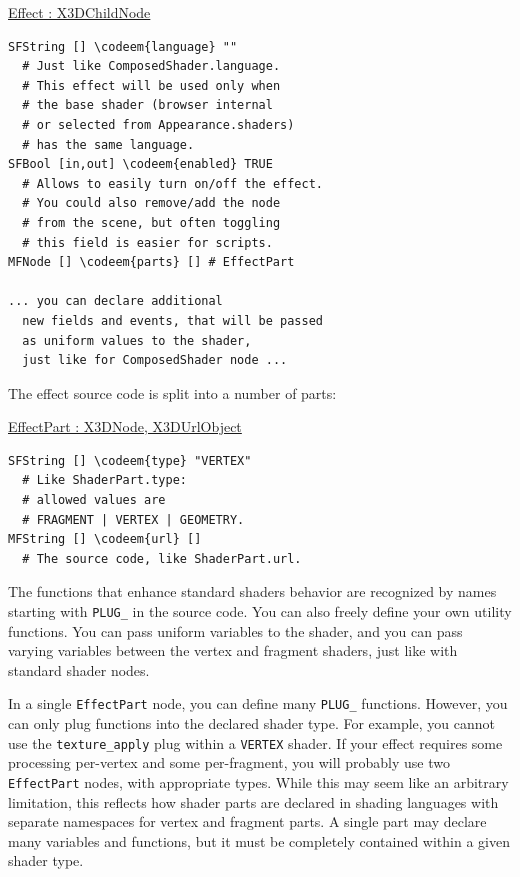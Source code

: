 \documentclass{acmsiggraph}                     %
\newenvironment{mycode}
{\begin{mycodecore}}
{\end{mycodecore}
\vspace{-0.1in}}
\newcommand*{\codeem}[1]{\textbf{#1}}
\begin{document}
\begin{mycode}
\underline{Effect : X3DChildNode}
\begin{Verbatim}[commandchars=\\\{\}]
SFString [] \codeem{language} ""
  # Just like ComposedShader.language.
  # This effect will be used only when
  # the base shader (browser internal
  # or selected from Appearance.shaders)
  # has the same language.
SFBool [in,out] \codeem{enabled} TRUE
  # Allows to easily turn on/off the effect.
  # You could also remove/add the node
  # from the scene, but often toggling
  # this field is easier for scripts.
MFNode [] \codeem{parts} [] # EffectPart

... you can declare additional
  new fields and events, that will be passed
  as uniform values to the shader,
  just like for ComposedShader node ...
\end{Verbatim}
\end{mycode}

\needspace{1in}
The effect source code is split into a number of parts:

\begin{mycode}
\underline{EffectPart : X3DNode, X3DUrlObject}
\begin{Verbatim}[commandchars=\\\{\}]
SFString [] \codeem{type} "VERTEX"
  # Like ShaderPart.type:
  # allowed values are
  # FRAGMENT | VERTEX | GEOMETRY.
MFString [] \codeem{url} []
  # The source code, like ShaderPart.url.
\end{Verbatim}
\end{mycode}


The functions that enhance standard shaders behavior are recognized
by names starting with \texttt{PLUG\_} in the source code.
You can also freely define your own utility functions.
You can pass uniform variables to the shader,
and you can pass varying variables between the vertex and fragment
shaders, just like with standard shader nodes.

In a single \texttt{EffectPart} node, you can define many \texttt{PLUG\_}
functions. However, you can only plug functions into the declared shader
type. For example, you cannot use the \texttt{texture\_apply} plug within
a \texttt{VERTEX} shader.
If your effect requires some processing per-vertex and some per-fragment,
you will probably use two \texttt{EffectPart} nodes, with appropriate types.
While this may seem like an arbitrary limitation,
this reflects how shader parts are declared in shading languages with
separate namespaces for vertex and fragment parts.
A single part may declare many variables and functions,
but it must be completely contained within a given shader type.
\end{document}
